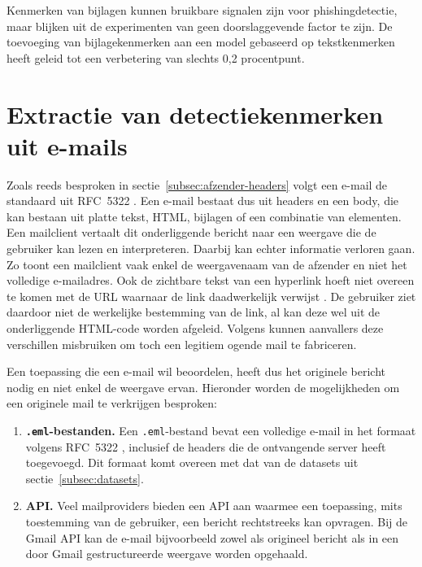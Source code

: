 Kenmerken van bijlagen kunnen bruikbare signalen zijn voor phishingdetectie, maar blijken uit de experimenten van \textcite{Mendes2025} geen doorslaggevende factor te zijn. De toevoeging van bijlagekenmerken aan een model gebaseerd op tekstkenmerken heeft geleid tot een verbetering van slechts 0,2 procentpunt.

\section{Extractie van detectiekenmerken uit e-mails}%
\label{sec:extractie-detectiekenmerken}

Zoals reeds besproken in sectie~\ref{subsec:afzender-headers} volgt een e-mail de standaard uit RFC~5322 \autocite{Resnick2008}. Een e-mail bestaat dus uit headers en een body, die kan bestaan uit platte tekst, HTML, bijlagen of een combinatie van elementen. Een mailclient vertaalt dit onderliggende bericht naar een weergave die de gebruiker kan lezen en interpreteren. Daarbij kan echter informatie verloren gaan. Zo toont een mailclient vaak enkel de weergavenaam van de afzender en niet het volledige e-mailadres. Ook de zichtbare tekst van een hyperlink hoeft niet overeen te komen met de URL waarnaar de link daadwerkelijk verwijst \autocite{Veit2025}. De gebruiker ziet daardoor niet de werkelijke bestemming van de link, al kan deze wel uit de onderliggende HTML-code worden afgeleid. Volgens \textcite{Chen2020} kunnen aanvallers deze verschillen misbruiken om toch een legitiem ogende mail te fabriceren.

Een toepassing die een e-mail wil beoordelen, heeft dus het originele bericht nodig en niet enkel de weergave ervan. Hieronder worden de mogelijkheden om een originele mail te verkrijgen besproken:

\begin{enumerate}
    \item \textbf{\texttt{.eml}-bestanden.} Een \texttt{.eml}-bestand bevat een volledige e-mail in het formaat volgens RFC~5322 \autocite{Resnick2008}, inclusief de headers die de ontvangende server heeft toegevoegd. Dit formaat komt overeen met dat van de datasets uit sectie~\ref{subsec:datasets}.
    \item \textbf{API.} Veel mailproviders bieden een API aan waarmee een toepassing, mits toestemming van de gebruiker, een bericht rechtstreeks kan opvragen. Bij de Gmail API kan de e-mail bijvoorbeeld zowel als origineel bericht als in een door Gmail gestructureerde weergave worden opgehaald.
\end{enumerate}

